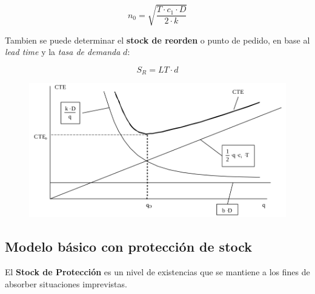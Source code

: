 \documentclass{article}
\begin{document}
\begin{equation}
    n_0 = \sqrt{\frac{T \cdot c_1 \cdot D}{2 \cdot k}}
\end{equation}

Tambien se puede determinar el \textbf{stock de reorden} o punto de pedido, en base al \textit{lead time} y la \textit{tasa de demanda} \(d\):

\begin{equation}
    S_R = LT \cdot d
\end{equation}

\begin{figure}[h!]
    \includegraphics[width=\linewidth]{imagenes/stock-q-optimo.png}
\end{figure}

\newpage
\subsection{Modelo básico con protección de stock}

El \textbf{Stock de Protección} es un nivel de existencias que se mantiene a los fines de absorber situaciones imprevistas.
\end{document}
